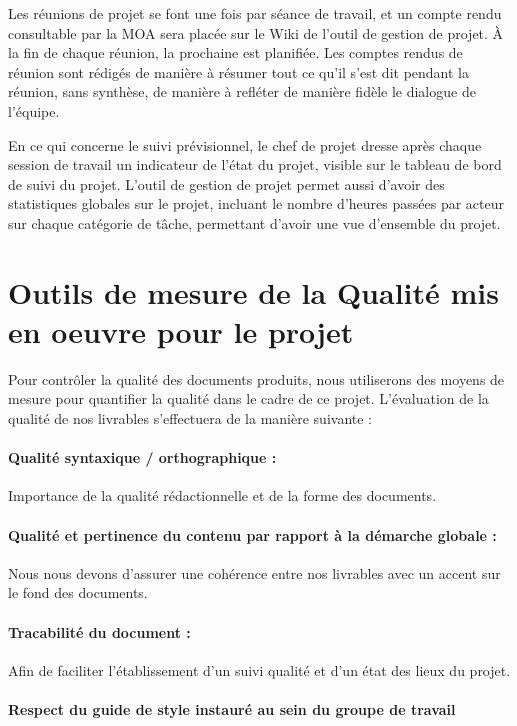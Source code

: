 Les réunions de projet se font une fois par séance de travail, et un compte rendu consultable par la MOA sera placée sur le Wiki de l'outil de gestion de projet. À la fin de chaque réunion, la prochaine est planifiée. Les comptes rendus de réunion sont rédigés de manière à résumer tout ce qu'il s'est dit pendant la réunion, sans synthèse, de manière à refléter de manière fidèle le dialogue de l'équipe.

En ce qui concerne le suivi prévisionnel, le chef de projet dresse après chaque session de travail un indicateur de l'état du projet, visible sur le tableau de bord de suivi du projet. L'outil de gestion de projet permet aussi d'avoir des statistiques globales sur le projet, incluant le nombre d'heures passées par acteur sur chaque catégorie de tâche, permettant d'avoir une vue d'ensemble du projet.

\section{Outils de mesure de la Qualité mis en oeuvre pour le projet}

Pour contrôler la qualité des documents produits, nous utiliserons des moyens de mesure pour quantifier la qualité dans le cadre de ce projet. L'évaluation de la qualité de nos livrables s'effectuera de la manière suivante :

\paragraph*{Qualité syntaxique / orthographique :} Importance de la qualité rédactionnelle et de la forme des documents.
\paragraph*{Qualité et pertinence du contenu par rapport à la démarche globale :} Nous nous devons d’assurer une cohérence entre nos livrables avec un accent sur le fond des documents.
\paragraph*{Tracabilité du document :} Afin de faciliter l’établissement d’un suivi qualité et d’un état des lieux du projet.
\paragraph*{Respect du guide de style instauré au sein du groupe de travail}


